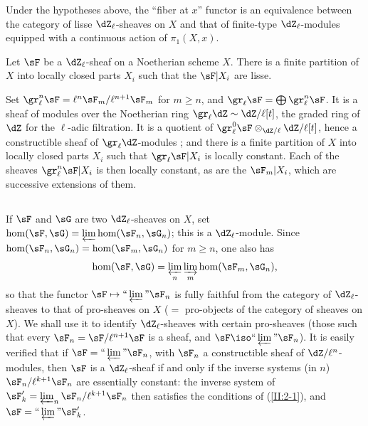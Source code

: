 \begin{proposition_}\label{II:2-4}
Under the hypotheses above, the ``fiber at $x$'' functor is an equivalence
between the category of lisse $\dZ_\ell$-sheaves on $X$ and that of
finite-type $\dZ_\ell$-modules equipped with a continuous action of
$\pi_1(X,x)$.
\end{proposition_}






\begin{proposition_}\label{II:2-5}
Let $\sF$ be a $\dZ_\ell$-sheaf on a Noetherian scheme $X$. There is a finite
partition of $X$ into locally closed parts $X_i$ such that the $\sF|X_i$ are
lisse.
\end{proposition_}

Set $\gr_\ell^n\sF=\ell^n\sF_m/\ell^{n+1}\sF_m$ for $m\geqslant n$, and
$\gr_\ell\sF=\bigoplus \gr_\ell^n\sF$. It is a sheaf of modules over the
Noetherian ring $\gr_\ell\dZ\sim\dZ/\ell[t]$, the graded ring of $\dZ$ for the
$\ell$-adic filtration. It is a quotient of
$\gr_\ell^0\sF \otimes_{\dZ/\ell} \dZ/\ell[t]$, hence a constructible sheaf
of $\gr_\ell\dZ$-modules \cite[IX.2]{sga4}; and there is a finite partition
of $X$ into locally closed parts $X_i$ such that
$\gr_\ell \sF|X_i$ is locally constant. Each of the sheaves
$\gr_\ell^n\sF|X_i$ is then locally constant, as are the $\sF_m|X_i$, which
are successive extensions of them.






\subsection{}\label{II:2-6}

If $\sF$ and $\sG$ are two $\dZ_\ell$-sheaves on $X$, set
$\hom(\sF,\sG) = \varprojlim \hom(\sF_n,\sG_n)$; this is a $\dZ_\ell$-module.
Since $\hom(\sF_n,\sG_n) = \hom(\sF_m,\sG_n)$ for $m\geqslant n$, one also
has
\[
  \hom(\sF,\sG) = \varprojlim_n \varinjlim_m \hom(\sF_m,\sG_n) \text{,}
\]
so that the functor $\sF\mapsto \text{``}\varprojlim\text{''}\sF_n$ is fully
faithful from the category of $\dZ_\ell$-sheaves to that of pro-sheaves on
$X$ ($=$ pro-objects of the category of sheaves on $X$). We shall use it to
identify $\dZ_\ell$-sheaves with certain pro-sheaves (those such that every
$\sF_n=\sF/\ell^{n+1}\sF$ is a sheaf, and
$\sF\iso \text{``}\varprojlim\text{''}\sF_n$). It is easily verified that if
$\sF=\text{``}\varprojlim\text{''}\sF_n$, with $\sF_n$ a constructible sheaf
of $\dZ/\ell^n$-modules, then $\sF$ is a $\dZ_\ell$-sheaf if and only if the
inverse systems (in $n$) $\sF_n/\ell^{k+1}\sF_n$ are essentially constant:
the inverse system of
$\sF_k'=\varprojlim_n\sF_n/\ell^{k+1}\sF_n$ then satisfies the conditions of
(\ref{II:2-1}), and
$\sF=\text{``}\varprojlim\text{''}\sF_k'$.

